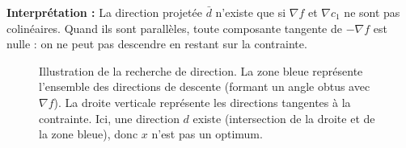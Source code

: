 \begin{figureexplanation}
\textbf{Interprétation :} La direction projetée $\bar{d}$ n'existe que si $\nabla f$ et $\nabla c_1$ ne sont pas colinéaires. Quand ils sont parallèles, toute composante tangente de $-\nabla f$ est nulle : on ne peut pas descendre en restant sur la contrainte.
\end{figureexplanation}

\begin{figure}[H]
\centering
{}
\caption{Illustration de la recherche de direction. La zone bleue représente l'ensemble des directions de descente (formant un angle obtus avec $\nabla f$). La droite verticale représente les directions tangentes à la contrainte. Ici, une direction $d$ existe (intersection de la droite et de la zone bleue), donc $x$ n'est pas un optimum.}
\label{fig:direction-finding}
\end{figure}

